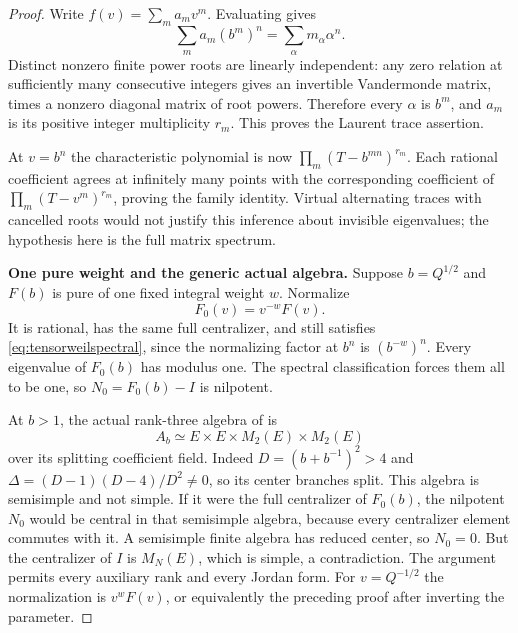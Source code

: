\begin{proof}
Write $f(v)=\sum_m a_m v^m$. Evaluating gives
\[
 \sum_m a_m(b^m)^n=\sum_\alpha m_\alpha\alpha^n.
\]
Distinct nonzero finite power roots are linearly
independent: any zero relation at sufficiently many
consecutive integers gives an invertible Vandermonde
matrix, times a nonzero diagonal matrix of root powers.
Therefore every $\alpha$ is $b^m$, and $a_m$ is its
positive integer multiplicity $r_m$.
This proves the Laurent trace assertion.

At $v=b^n$ the characteristic polynomial is now
$\prod_m(T-b^{mn})^{r_m}$.
Each rational coefficient agrees at infinitely many
points with the corresponding coefficient of
$\prod_m(T-v^m)^{r_m}$, proving the family identity.
Virtual alternating traces with cancelled roots would
not justify this inference about invisible eigenvalues;
the hypothesis here is the full matrix spectrum.

\par\smallskip\noindent\textbf{One pure weight and the generic actual algebra.}\quad
Suppose $b=Q^{1/2}$ and $F(b)$ is pure of one fixed
integral weight $w$. Normalize
\[
 F_0(v)=v^{-w}F(v).
\]
It is rational, has the same full centralizer, and still
satisfies \eqref{eq:tensorweilspectral}, since the
normalizing factor at $b^n$ is $(b^{-w})^n$.
Every eigenvalue of $F_0(b)$ has modulus one.
The spectral classification forces them all to be one,
so $N_0=F_0(b)-I$ is nilpotent.

At $b>1$, the actual rank-three algebra of  is
\[
 A_b\simeq E\times E\times M_2(E)\times M_2(E)
\]
over its splitting coefficient field.
Indeed $D=(b+b^{-1})^2>4$ and
$\Delta=(D-1)(D-4)/D^2\ne0$, so its center branches split.
This algebra is semisimple and not simple.
If it were the full centralizer of $F_0(b)$, the
nilpotent $N_0$ would be central in that semisimple algebra,
because every centralizer element commutes with it.
A semisimple finite algebra has reduced center, so
$N_0=0$. But the centralizer of $I$ is $M_N(E)$,
which is simple, a contradiction.
The argument permits every auxiliary rank and every
Jordan form. For $v=Q^{-1/2}$ the normalization is
$v^wF(v)$, or equivalently the preceding proof after
inverting the parameter.


\end{proof}
